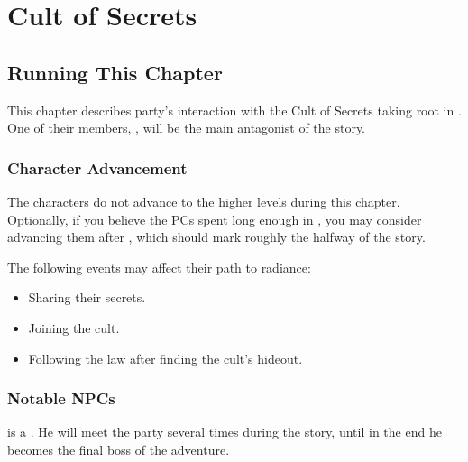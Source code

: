 \chapter{Cult of Secrets}
\label{chap:chapterCult}

\setcounter{section}{-1}
\section{Running This Chapter}

This chapter describes party's interaction with the Cult of Secrets taking root in \locationYeddaw{}. One of their members, \npcBlindBeggar{}, will be the main antagonist of the story.

\subsection{Character Advancement}

The characters do not advance to the higher levels during this chapter. Optionally, if you believe the PCs spent long enough in \locationYeddaw{}, you may consider advancing them after , which should mark roughly the halfway of the story.

The following events may affect their path to radiance:
\begin{itemize}
	\item Sharing their secrets.
	\item Joining the cult.
	\item Following the law after finding the cult's hideout.
\end{itemize}


\subsection{Notable NPCs}

\npcBlindBeggar[s]{} is a \enemyCorruptedLightweaverC{}. He will meet the party several times during the story, until in the end he becomes the final boss of the adventure.














